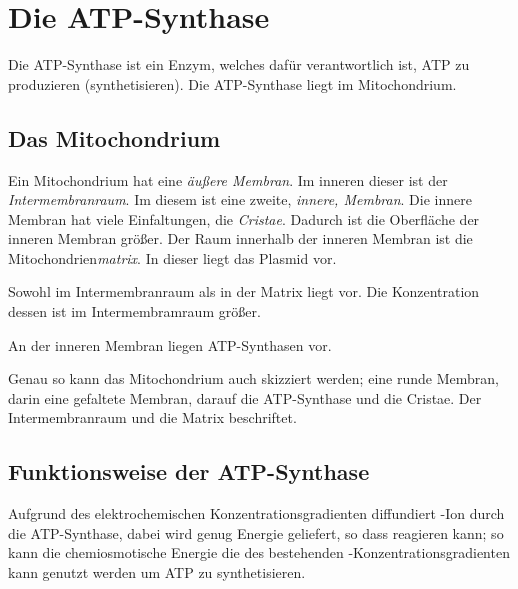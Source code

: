 \documentclass{article}
\begin{document}
\section{Die ATP-Synthase}
Die ATP-Synthase ist ein Enzym, welches dafür verantwortlich ist, ATP zu produzieren (synthetisieren). Die ATP-Synthase liegt im Mitochondrium.
 
\subsection{Das Mitochondrium} 
Ein Mitochondrium hat eine \emph{äußere Membran}. Im inneren dieser ist der \emph{Intermembranraum}. Im diesem ist eine zweite, \emph{innere, Membran}. Die innere Membran hat viele Einfaltungen, die \emph{Cristae}. Dadurch ist die Oberfläche der inneren Membran größer. Der Raum innerhalb der inneren Membran ist die Mitochondrien\emph{matrix}. In dieser liegt das Plasmid vor.
 
Sowohl im Intermembranraum als in der Matrix liegt  vor. Die Konzentration dessen ist im Intermembramraum größer.
 
An der inneren Membran liegen ATP-Synthasen vor.

Genau so kann das Mitochondrium auch skizziert werden; eine runde Membran, darin eine gefaltete Membran, darauf die ATP-Synthase und die Cristae. Der Intermembranraum und die Matrix beschriftet.

\subsection{Funktionsweise der ATP-Synthase} 
Aufgrund des elektrochemischen Konzentrationsgradienten diffundiert -Ion durch die ATP-Synthase, dabei wird genug Energie geliefert, so dass  reagieren kann; so kann die chemiosmotische Energie die des bestehenden -Konzentrationsgradienten kann genutzt werden um ATP zu synthetisieren.
\end{document}
